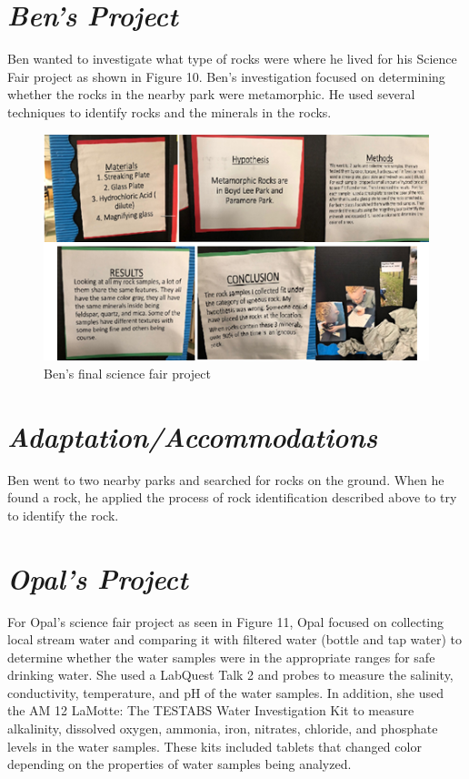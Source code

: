 \documentclass[11.5pt]{sig-alternate}
\begin{document}
\begin{large}
\section*{\textit{Ben’s Project}} 
Ben wanted to investigate what type of rocks were where he lived for his Science Fair project as shown in Figure 10.  Ben’s investigation focused on determining whether the rocks in the nearby park were metamorphic. He used several techniques to identify rocks and the minerals in the rocks. 

\begin{figure}[htp] 
  \renewcommand{\thefigure}{10}
    \centering
    \includegraphics[width=\columnwidth]{figure10.png}
    \caption{Ben’s  final science fair project }
    \label{ Ben’s  final science fair project }
\end{figure}

\section*{\textit{Adaptation/Accommodations}}
 Ben went to two nearby parks and searched for rocks on the ground. When he found a rock, he applied the process of rock identification described above to try to identify the rock.
 \newpage
\section*{\textit{Opal’s Project}} 
For Opal’s science fair project as seen in Figure 11, Opal focused on collecting local stream water and comparing it with filtered water (bottle and tap water) to determine whether the water samples were in the appropriate ranges for safe drinking water. She used a LabQuest Talk 2  and probes to measure the salinity, conductivity, temperature, and pH of the water samples.  In addition, she used the AM 12 LaMotte: The TESTABS Water Investigation Kit to measure alkalinity, dissolved oxygen, ammonia, iron, nitrates, chloride, and phosphate levels in the water samples. These kits included tablets that changed color depending on the properties of water samples being analyzed.  


\end{large}
\end{document}
